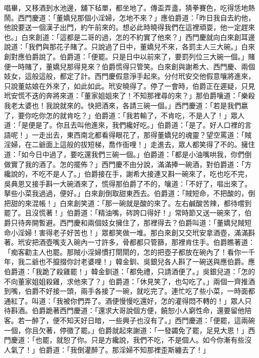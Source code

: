 \begin{showcontents}{}
唱畢，又移酒到水池邊，舖下毡單，都坐地了。傳盃弄盞，猜拳賽色，吃得恁地熱鬧。西門慶道：「董嬌兒那個小淫婦，怎地不來？」應伯爵道：「昨日我自去約他，他說要送一個漢子出門，約午前來的。想必此時曉得我們在這裡頑耍，他一定趕來也。」白來創道：「這都是二哥的過，怎的不約實了他來？」西門慶就向白來創耳邊說道：「我們與那花子賭了。只說過了日中，董嬌兒不來，各罰主人三大碗。」白來創對應伯爵說了。伯爵道：「便罷。只是日中以前來了，要罰列位三大碗一個。」賭便一時賭了，董嬌兒那得見來？伯爵慌得只管笑。白來創與謝希大、西門慶、兩個妓女，這般這般，都定了計。西門慶假意淨手起來。分付玳安交他假意嚷將進來，只說董姑娘在外來了，如此如此。玳安曉得了。停了一會時，伯爵正在遲疑，只見玳安慌不迭的奔將來道：「董家姐姐來了！不知那裡尋的來？」那伯爵嚷道：「樂殺我老太婆也！我說就來的。快把酒來，各請三碗一個。」西門慶道：「若是我們嬴了，要你吃你怎的就肯吃？」伯爵道：「我若輸了，不肯吃，不是人了！」眾人道：「是便是了。你且去叫他進來，我們纔好吃。」伯爵道：「是了。好人口裡的言語呢！」一走出去，東西南北都看得眼花了，那得董嬌兒的魂靈？望空罵道：「賊淫婦，在二爺面上這般的拔短梯，喬作衙哩！」走進去，眾人都笑得了不的。擁住道：「如今日中過了，要吃還我們三碗一個。」伯爵道：「都是小油嘴哄我，你們倒做實了我的酒了。怎的擺佈？」西門慶不由分說，滿滿捧一碗酒，對伯爵道：「方纔說的，不吃不是人了。」伯爵接在手，謝希大接連又斟一碗來了，吃也吃不完，吳典恩又接手斟一大碗酒來了，慌得那伯爵了不的，嚷道：「不好了，嘔出來了。拏些小菜我過過，便好。」白來創倒取甜東西去。伯爵道：「賊短命，不把酸的，倒把甜的來混帳！」白來創笑道：「那一碗就是酸的來了。左右鹹酸苦辣，都待嚐到罷了。且沒慌著！」伯爵道：「精油嘴，硶誇口得好！」常時節又送一碗來了，伯爵只待奔開暫避。西門慶和兩個妓女擁住了，那裡得去？伯爵叫道：「董嬌兒賊短命小淫婦！害得老子好苦也！」眾都笑做一堆。那白來創又交玳安拿酒壺，滿滿斟著。玳安把酒壺嘴支入碗內一寸許多，骨都都只管篩，那裡肯住手。伯爵瞧著道：「痴客勸主人也罷。那賊小淫婦慣打閛閛的，怎的把壺子都放在碗內了！看你一千年，我二爺也不攛掇你討老婆哩！」韓金釧、吳銀兒各人斟了一碗送與應伯爵。應伯爵道：「我跪了殺雞罷！」韓金釧道：「都免禮，只請酒便了。」吳銀兒道：「怎的不向董家姐姐殺雞，求他來了？」伯爵道：「休見笑了，也勾吃了。」兩個一齊推酒到嘴，伯爵不好接一頭，兩手各接了一碗，就吃完了。連忙吃了些小菜，一時面都通紅了。叫道：「我被你們弄了。酒便慢慢吃還好，怎的灌得悶不轉的！」眾人只待斟酒。伯爵跪著西門慶道：「還求大哥說個方便，饒恕小人窮性命，還要留他陪客。若一醉了，便不知天好日暗，一些興子也沒有了。」西門慶道：「便罷，這兩碗一個，你且欠著，停徵了罷。」伯爵就起來謝道：「一發蠲免了罷，足見大恩！」西門慶道：「也罷，就恕了你。只是方纔說，我們不吃，不是個人。如今你漸有些沒人氣了！」伯爵道：「我倒灌醉了。那淫婦不知那裡歪斯纏去了！」


\end{showcontents}

